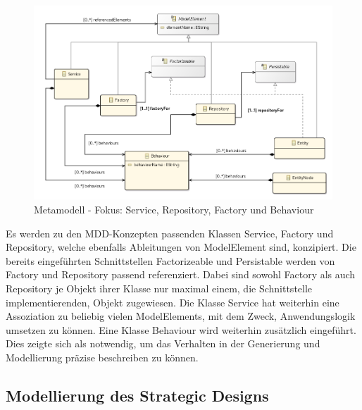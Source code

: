 \newpage


\begin{figure}[ht]
\centering
\includegraphics[width=\textwidth]{bilder/k4/3.png}
\caption{Metamodell - Fokus: Service, Repository, Factory und Behaviour}
\end{figure}

Es werden zu den MDD-Konzepten passenden Klassen \glqq Service\grqq{}, \glqq Factory\grqq{} und \glqq Repository\grqq{}, welche ebenfalls Ableitungen von ModelElement sind, konzipiert. Die bereits eingeführten Schnittstellen Factorizeable und Persistable werden von Factory und Repository passend referenziert. Dabei sind sowohl Factory als auch Repository je Objekt ihrer Klasse nur maximal einem, die Schnittstelle implementierenden, Objekt zugewiesen. Die Klasse Service hat weiterhin eine Assoziation zu beliebig vielen ModelElements, mit dem Zweck, Anwendungslogik umsetzen zu können. Eine Klasse Behaviour wird weiterhin zusätzlich eingeführt. Dies zeigte sich als notwendig, um das Verhalten in der Generierung und Modellierung präzise beschreiben zu können.


\newpage
\subsection{Modellierung des Strategic Designs}

